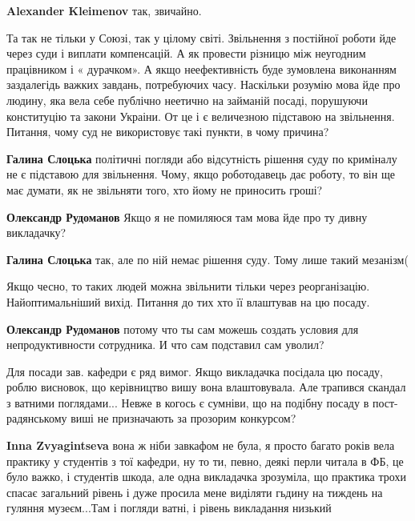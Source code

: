 \begin{itemize}
\begin{itemize}
\textbf{Alexander Kleimenov} так, звичайно.

\end{itemize} %


Та так не тільки у Союзі, так у цілому світі. Звільнення з постійної роботи йде
через суди і виплати компенсацій. А як провести різницю між неугодним
працівником і « дурачком». А якщо неефективність буде зумовлена виконанням
заздалегідь важких завдань, потребуючих часу. Наскільки розумію мова йде про
людину, яка вела себе публічно неетично на займаній посаді, порушуючи
конституцію та закони Украіни. От це і є величезною підставою на звільнення.
Питання, чому суд не використовує такі пункти, в чому причина?

\begin{itemize} %
\textbf{Галина Слоцька} політичні погляди або відсутність рішення суду по криміналу не є підставою для звільнення.
Чому, якщо роботодавець дає роботу, то він ще має думати, як не звільняти того, хто йому не приносить гроші?

\textbf{Олександр Рудоманов} Якщо я не помиляюся там мова йде про ту дивну викладачку?


\textbf{Галина Слоцька} так, але по ній немає рішення суду.
Тому лише такий мезанізм(

Якщо чесно, то таких людей можна звільнити тільки через реорганізацію. Найоптимальніший вихід. Питання до тих хто її влаштував на цю посаду.

\textbf{Олександр Рудоманов} потому что ты сам можешь создать условия для непродуктивности сотрудника. И что сам подставил сам уволил?
\end{itemize} %


Для посади зав. кафедри є ряд вимог. Якщо викладачка посідала цю посаду, роблю
висновок, що керівництво вишу вона влаштовувала. Але трапився скандал з ватними
поглядами... Невже в когось є сумніви, що на подібну посаду в пост-радянському
виші не призначають за прозорим конкурсом?

\begin{itemize} %
\textbf{Inna Zvyagintseva} вона ж ніби завкафом не була, я просто багато років вела практику у студентів з тої кафедри, ну то ти, певно, деякі перли читала в ФБ, це було важко, і студентів шкода, але одна викладачка зрозуміла, що практика трохи спасає загальний рівень і дуже просила мене виділяти гьдину на тиждень на гуляння музеєм...Там і погляди ватні, і рівень викладання низький
\end{itemize} %


\end{itemize}
